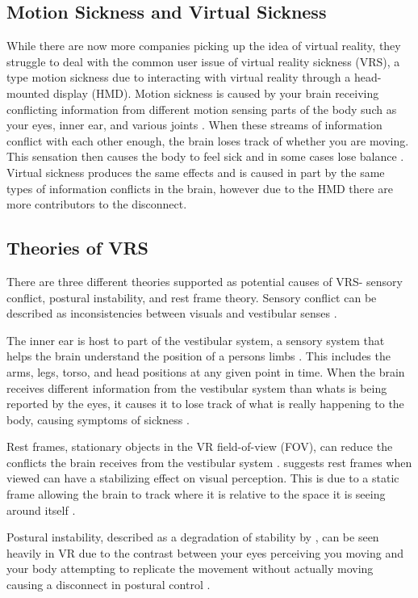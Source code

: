 \documentclass[sigconf]{acmart}
\begin{document}
\subsection{Motion Sickness and Virtual Sickness}
While there are now more companies picking up the idea of virtual reality, they struggle to deal with the common user issue of virtual reality sickness (VRS), a type motion sickness due to interacting with virtual reality through a head-mounted display (HMD). Motion sickness is caused by your brain receiving conflicting information from different motion sensing parts of the body such as your eyes, inner ear, and various joints \cite{motion}. When these streams of information conflict with each other enough, the brain loses track of whether you are moving. This sensation then causes the body to feel sick and in some cases lose balance \cite{chang20, kennedy10}. Virtual sickness produces the same effects and is caused in part by the same types of information conflicts in the brain, however due to the HMD there are more contributors to the disconnect.
\subsection{Theories of VRS}
There are three different theories supported as potential causes of VRS- sensory conflict, postural instability, and rest frame theory. Sensory conflict can be described as inconsistencies between visuals and vestibular senses \cite{ng20}. 

The inner ear is host to part of the vestibular system, a sensory system that helps the brain understand the position of a persons limbs \cite{Hu17}. This includes the arms, legs, torso, and head positions at any given point in time. When the brain receives different information from the vestibular system than whats is being reported by the eyes, it causes it to lose track of what is really happening to the body, causing symptoms of sickness \cite{stanney20}. 

Rest frames, stationary objects in the VR field-of-view (FOV), can reduce the conflicts the brain receives from the vestibular system \cite{Luks19, chang13}. \cite{cao18} suggests rest frames when viewed can have a stabilizing effect on visual perception. This is due to a static frame allowing the brain to track where it is relative to the space it is seeing around itself \cite{porcino20}.

Postural instability, described as a degradation of stability by \cite{chang12}, can be seen heavily in VR due to the contrast between your eyes perceiving you moving and your body attempting to replicate the movement without actually moving causing a disconnect in postural control \cite{sun20}. 
\end{document}

